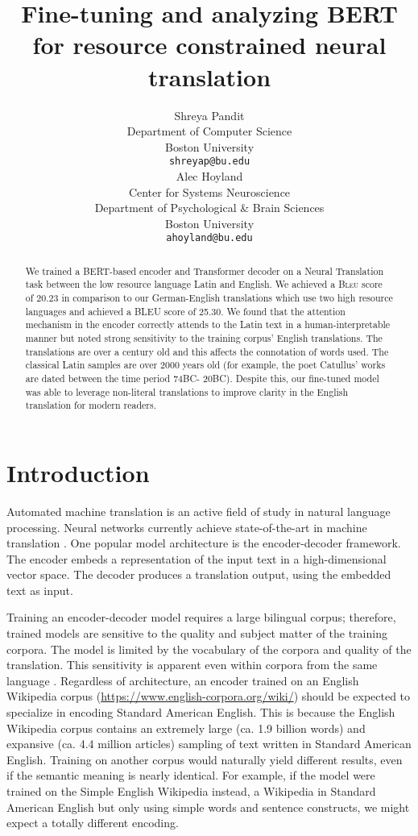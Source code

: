 \documentclass[11pt,a4paper]{article}
\title{Fine-tuning and analyzing BERT for resource constrained neural translation}
\author{Shreya Pandit \\
  Department of Computer Science \\
  Boston University \\
  \texttt{shreyap@bu.edu} \\\And
  Alec Hoyland \\
  Center for Systems Neuroscience \\
  Department of Psychological \& Brain Sciences \\
  Boston University \\
  \texttt{ahoyland@bu.edu} \\}
\date{}
\begin{document}
\maketitle
\begin{abstract}
    We trained a \textsc{BERT}-based encoder and Transformer decoder on
    a Neural Translation task between the low resource language Latin
    and English.
    We achieved a \textsc{Bleu} score of 20.23 in comparison to
    our German-English translations which use two high resource languages and achieved a BLEU score of 25.30. We found that the attention mechanism in the encoder correctly attends to the Latin text in a human-interpretable manner
    but noted strong sensitivity to the training corpus' English translations.
    The translations are over a century old
    and this affects the connotation of words used.
    The classical Latin samples are over 2000 years old (for example, the poet Catullus' works are dated between the time period 74BC- 20BC). Despite this, our fine-tuned model was able to leverage non-literal translations to improve clarity in the English translation for modern readers.
\end{abstract}

\section{Introduction}

Automated machine translation is an active field of study in natural language processing. Neural networks currently achieve state-of-the-art in machine translation \citep{ott2019fairseq, tensor2tensor}.
One popular model architecture is the encoder-decoder framework. The encoder embeds a representation of the input text in a high-dimensional vector space. 
The decoder produces a translation output, using the embedded text as input.

Training an encoder-decoder model requires a large bilingual corpus; therefore, trained models are sensitive to the quality and subject matter of the training corpora.
The model is limited by the vocabulary of the corpora and quality of the translation.
This sensitivity is apparent even within corpora from the same language \citep{dellorletta2014linguistic}.
Regardless of architecture, an encoder trained on an English Wikipedia corpus (\href{https://www.english-corpora.org/wiki/}{https://www.english-corpora.org/wiki/}) should be expected to specialize in encoding Standard American English.
This is because the English Wikipedia corpus contains an extremely large (ca. 1.9 billion words) and expansive (ca. 4.4 million articles) sampling of text written in Standard American English.
Training on another corpus would naturally yield different results,
even if the semantic meaning is nearly identical.
For example, if the model were trained on the Simple English Wikipedia instead, a Wikipedia in Standard American English but only using simple words and sentence constructs, we might expect a totally different encoding.
\end{document}
